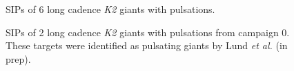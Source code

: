 \documentclass[useAMS, usenatbib]{aastex}
\begin{document}
\begin{figure}
\begin{center}
{        }
    \end{center}
    \caption{SIPs of 6 long cadence {\it K2} giants with pulsations.
\label{fig:astero_examples}}
\end{figure}

\begin{figure}
\begin{center}
    \end{center}
    \caption{SIPs of 2 long cadence {\it K2} giants with
	    pulsations from campaign 0. These targets were identified as
	    pulsating giants by Lund {\it et al.} (in prep).
\label{fig:c0}}
\end{figure}
\end{document}
